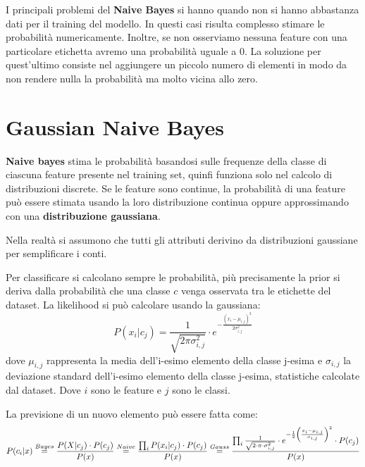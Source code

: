 I principali problemi del \textbf{Naive Bayes} si hanno quando non si hanno abbastanza
dati per il training del modello. In questi casi risulta complesso stimare le
probabilità numericamente. Inoltre, se non osserviamo nessuna feature con una
particolare etichetta avremo una probabilità uguale a $0$. La soluzione per
quest'ultimo consiste nel aggiungere un piccolo numero di elementi in modo da
non rendere nulla la probabilità ma molto vicina allo zero.
\section{Gaussian Naive Bayes}
\textbf{Naive bayes} stima le probabilità basandosi sulle frequenze della classe di ciascuna
feature presente nel training set, quinfi funziona solo nel calcolo di distribuzioni
discrete. Se le feature sono continue, la probabilità di una feature può essere 
stimata usando la loro distribuzione continua oppure approssimando con una 
\textbf{distribuzione gaussiana}. 

Nella realtà si assumono che tutti gli attributi derivino da distribuzioni gaussiane 
per semplificare i conti.

Per classificare si calcolano sempre le probabilità, più precisamente la prior si
deriva dalla probabilità che una classe $c$ venga osservata tra le etichette del dataset. 
La likelihood si può calcolare usando la gaussiana:
\begin{equation}
    P(x_i|c_j) = \frac{1}{\sqrt{2 \pi \sigma_{i, j}^2}} \cdot e^{-\frac{(x_i - \mu_{i,j})^2}{2 \sigma_{i,j}^2}}
\end{equation}
dove $\mu_{i, j}$ rappresenta la media dell'i-esimo elemento della classe j-esima e $\sigma_{i, j}$
la deviazione standard dell'i-esimo elemento della classe j-esima, statistiche 
calcolate dal dataset. Dove $i$ sono le feature e $j$ sono le classi.

La previsione di un nuovo elemento può essere fatta come:
\begin{equation*}
    P(c_i | x) \stackrel{Bayes}{=} \frac{P(X | c_j) \cdot P(c_j)}{P(x)} \\ \stackrel{Naive}{=} \frac{\prod_i P(x_i | c_j) \cdot P(c_j)}{P(x)} \\ \stackrel{Gauss}{=} \frac{\prod_i \frac{1}{\sqrt{2\cdot \pi \cdot \sigma_{i, j}^2}} \cdot e^{- \frac{1}{2} \left(\frac{x_i - \mu_{i, j}}{\sigma_{i, j}}\right)^2} \cdot P(c_j)}{P(x)}
\end{equation*}
